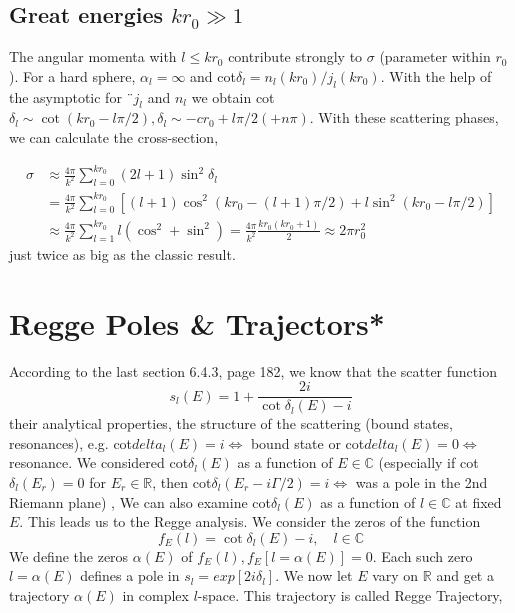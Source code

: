 \subsection{Great energies $kr_0\gg 1$}
The angular momenta with $l \leq kr_0$ contribute strongly to $\sigma$ (parameter within $r_0$). For a hard sphere, $\alpha_l = \infty$ and cot$\delta_l = n_l (kr_0) / j_l (kr_0)$. With the help of the asymptotic for $¨j_l$ and $n_l$ we obtain cot$\delta_l \sim\operatorname{cot}(kr_0 - l\pi / 2), \delta_l \sim -cr_0 + l\pi / 2 (+ n\pi)$. With these scattering phases, we can calculate the cross-section,

\begin{equation}
\begin{aligned} \sigma & \approx \frac{4 \pi}{k^{2}} \sum_{l=0}^{k r_{0}}(2 l+1) \sin ^{2} \delta_{l} \\ &=\frac{4 \pi}{k^{2}} \sum_{l=0}^{k r_{0}}\left[(l+1) \cos ^{2}\left(k r_{0}-(l+1) \pi / 2\right)+l \sin ^{2}\left(k r_{0}-l \pi / 2\right)\right] \\ & \approx \frac{4 \pi}{k^{2}} \sum_{l=1}^{k r_{0}} l\left(\cos ^{2}+\sin ^{2}\right)=\frac{4 \pi}{k^{2}} \frac{k r_{0}\left(k r_{0}+1\right)}{2} \approx 2 \pi r_{0}^{2} \end{aligned}
\end{equation}
just twice as big as the classic result.

\section{Regge Poles \& Trajectors*}
According to the last section 6.4.3, page 182, we know that the scatter function
\begin{equation}
    s_{l}(E)=1+\frac{2 i}{\cot \delta_{l}(E)-i}
    \end{equation}
their analytical properties, the structure of the scattering (bound states, resonances), e.g. cot$ delta_l (E) = i \Leftrightarrow$ bound state or cot$delta_l (E) = 0 \Leftrightarrow$ resonance. We considered cot$\delta_l (E)$ as a function of $E \in \mathbb{C}$ (especially if cot$\delta_l (E_r) = 0$ for $E_r \in \mathbb{R}$, then cot$\delta_l (E_r - i\Gamma / 2) = i \Leftrightarrow$ was a pole in the 2nd Riemann plane) , We can also examine cot$\delta_l (E)$ as a function of $l \in \mathbb{C}$ at fixed $E$. This leads us to the Regge analysis. We consider the zeros of the function
\begin{equation}
    f_{E}(l)=\cot \delta_{l}(E)-i, \quad l \in \mathbb{C}
    \end{equation}
We define the zeros $\alpha (E)$ of $f_E (l), f_E [l = \alpha (E)] = 0$. Each such zero $l = \alpha (E)$ defines a pole in $s_l = exp [2i\delta_l]$. We now let $E$ vary on $\mathbb{R}$ and get a trajectory $\alpha(E)$ in complex $l$-space. This trajectory is called Regge Trajectory,

